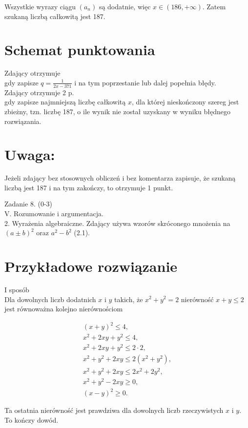 \documentclass[10pt]{article}
\begin{document}
Wszystkie wyrazy ciągu $\left(a_{n}\right)$ są dodatnie, więc $x \in(186,+\infty)$. Zatem szukaną liczbą całkowitą jest 187.

\section*{Schemat punktowania}
Zdający otrzymuje\\
gdy zapisze $q=\frac{1}{2 x-371}$ i na tym poprzestanie lub dalej popełnia błędy.\\
Zdający otrzymuje 2 p.\\
gdy zapisze najmniejszą liczbę całkowitą $x$, dla której nieskończony szereg jest zbieżny, tzn. liczbę 187, o ile wynik nie został uzyskany w wyniku błędnego rozwiązania.

\section*{Uwaga:}
Jeżeli zdający bez stosownych obliczeń i bez komentarza zapisuje, że szukaną liczbą jest 187 i na tym zakończy, to otrzymuje 1 punkt.

Zadanie 8. (0-3)\\
V. Rozumowanie i argumentacja.\\
2. Wyrażenia algebraiczne. Zdający używa wzorów skróconego mnożenia na $(a \pm b)^{2}$ oraz $a^{2}-b^{2}$ (2.1).

\section*{Przykładowe rozwiązanie}
I sposób\\
Dla dowolnych liczb dodatnich $x$ i $y$ takich, że $x^{2}+y^{2}=2$ nierówność $x+y \leq 2$ jest równoważna kolejno nierównościom

$$
\begin{gathered}
(x+y)^{2} \leq 4, \\
x^{2}+2 x y+y^{2} \leq 4, \\
x^{2}+2 x y+y^{2} \leq 2 \cdot 2, \\
x^{2}+y^{2}+2 x y \leq 2\left(x^{2}+y^{2}\right), \\
x^{2}+y^{2}+2 x y \leq 2 x^{2}+2 y^{2}, \\
x^{2}+y^{2}-2 x y \geq 0, \\
(x-y)^{2} \geq 0 .
\end{gathered}
$$

Ta ostatnia nierówność jest prawdziwa dla dowolnych liczb rzeczywistych $x$ i $y$. To kończy dowód.
\end{document}
